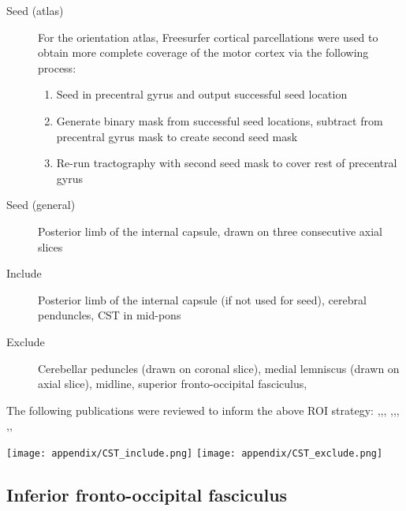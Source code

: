 \begin{description}
  \item[Seed (atlas)] For the orientation atlas, Freesurfer cortical parcellations were used to obtain more complete coverage of the motor cortex via the following process:
  \begin{enumerate}
    \item Seed in precentral gyrus and output successful seed location
    \item Generate binary mask from successful seed locations, subtract from precentral gyrus mask to create second seed mask
    \item Re-run tractography with second seed mask to cover rest of precentral gyrus
  \end{enumerate}
  \item[Seed (general)] Posterior limb of the internal capsule, drawn on three consecutive axial slices
  \item[Include] Posterior limb of the internal capsule (if not used for seed), cerebral penduncles, CST in mid-pons
  \item[Exclude] Cerebellar peduncles (drawn on coronal slice), medial lemniscus (drawn on axial slice), midline, superior fronto-occipital fasciculus,
\end{description}

The following publications were reviewed to inform the above ROI strategy: \textcite{Ciccarelli2006},\textcite{Han2010},\textcite{Hattingen2009a},
\textcite{Niu2016},\textcite{Radmanesh2015},\textcite{Reich2006},
\textcite{Rosenstock2017},\textcite{Szmuda2021},\textcite{Vargas2013}

\begin{figure*}[h]
  \centering
    \texttt{[image: appendix/CST\_include.png]}
    \texttt{[image: appendix/CST\_exclude.png]}
  \caption[Corticospinal tract tractography ROIs]{Seed (yellow), inclusion (green) and exclusion (red) \glspl{roi} for the corticospinal tract}
  \label{fig:rois.cst}
\end{figure*}

\subsection{Inferior fronto-occipital fasciculus}

